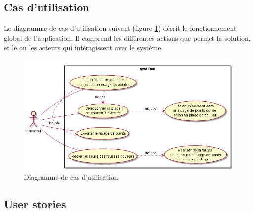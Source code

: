 \documentclass[12pt,titlepage,french]{article}
\begin{document}
\subsection*{Cas d'utilisation}

Le diagramme de cas d'utilisation suivant (figure \ref{Diagramme de cas d'utilisation}) décrit le fonctionnement global de l'application.
Il comprend les différentes actions que permet la solution, et le ou les acteurs qui intéragissent avec le système.

\begin{figure} [!hbtp]
 \centering
    \caption{Diagramme de cas d'utilisation}
    \label{Diagramme de cas d'utilisation}
    \includegraphics[scale=0.6]{img_diagrammes/use_cases.png}
\end{figure}

\break
\subsection*{User stories}
\end{document}
